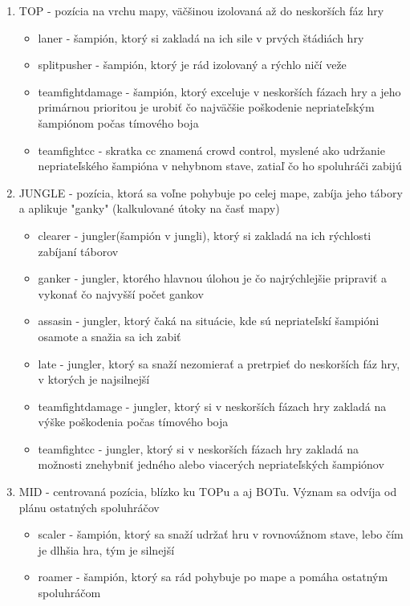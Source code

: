 \begin{enumerate}
	\item TOP - pozícia na vrchu mapy, väčšinou izolovaná až do neskorších fáz hry
	 \begin{itemize}
		\item laner - šampión, ktorý si zakladá na ich sile v prvých štádiách hry
		\item splitpusher - šampión, ktorý je rád izolovaný a rýchlo ničí veže
		\item teamfightdamage - šampión, ktorý exceluje v neskorších fázach hry a jeho primárnou prioritou je urobiť čo najväčšie poškodenie nepriateľským šampiónom počas tímového boja
		\item teamfightcc - skratka cc znamená crowd control, myslené ako udržanie nepriateľského šampióna v nehybnom stave, zatiaľ čo ho spoluhráči zabijú
	\end{itemize}
	\item JUNGLE - pozícia, ktorá sa voľne pohybuje po celej mape, zabíja jeho tábory a aplikuje "ganky" (kalkulované útoky na časť mapy)
	\begin{itemize}
		\item clearer - jungler(šampión v jungli), ktorý si zakladá na ich rýchlosti zabíjaní táborov
		\item ganker - jungler, ktorého hlavnou úlohou je čo najrýchlejšie pripraviť a vykonať čo najvyšší počet gankov
		\item assasin - jungler, ktorý čaká na situácie, kde sú nepriateľskí šampióni osamote a snažia sa ich zabiť
		\item late - jungler, ktorý sa snaží nezomierať a pretrpieť do neskorších fáz hry, v ktorých je najsilnejší
		\item teamfightdamage - jungler, ktorý si v neskorších fázach hry zakladá na výške poškodenia počas tímového boja
		\item teamfightcc - jungler, ktorý si v neskorších fázach hry zakladá na možnosti znehybniť jedného alebo viacerých nepriateľských šampiónov
	\end{itemize}
	\item MID - centrovaná pozícia, blízko ku TOPu a aj BOTu. Význam sa odvíja od plánu ostatných spoluhráčov
	\begin{itemize}
		\item scaler - šampión, ktorý sa snaží udržať hru v rovnovážnom stave, lebo čím je dlhšia hra, tým je silnejší
		\item roamer - šampión, ktorý sa rád pohybuje po mape a pomáha ostatným spoluhráčom

\end{itemize}
\end{enumerate}

